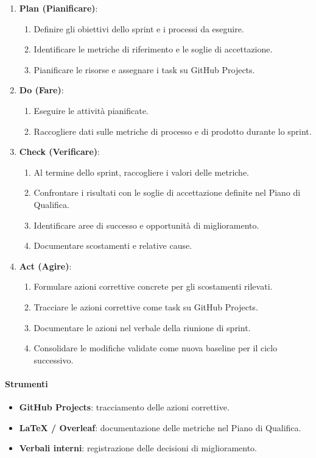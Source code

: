 \documentclass[a4paper, 11pt, oneside]{scrartcl}
\begin{document}
\begin{enumerate}
    \item \textbf{Plan (Pianificare)}:
    \begin{enumerate}[label=\alph*.]
        \item Definire gli obiettivi dello sprint e i processi da eseguire.
        \item Identificare le metriche di riferimento e le soglie di accettazione.
        \item Pianificare le risorse e assegnare i task su GitHub Projects.
    \end{enumerate}
    \item \textbf{Do (Fare)}:
    \begin{enumerate}[label=\alph*.]
        \item Eseguire le attività pianificate.
        \item Raccogliere dati sulle metriche di processo e di prodotto durante lo sprint.
    \end{enumerate}
    \item \textbf{Check (Verificare)}:
    \begin{enumerate}[label=\alph*.]
        \item Al termine dello sprint, raccogliere i valori delle metriche.
        \item Confrontare i risultati con le soglie di accettazione definite nel Piano di Qualifica{\scriptsize{}}.
        \item Identificare aree di successo e opportunità di miglioramento.
        \item Documentare scostamenti e relative cause.
    \end{enumerate}
    \item \textbf{Act (Agire)}:
    \begin{enumerate}[label=\alph*.]
        \item Formulare azioni correttive concrete per gli scostamenti rilevati.
        \item Tracciare le azioni correttive come task su GitHub Projects.
        \item Documentare le azioni nel verbale della riunione di sprint.
        \item Consolidare le modifiche validate come nuova baseline per il ciclo successivo.
    \end{enumerate}
\end{enumerate}

\paragraph{Strumenti}
\begin{itemize}
    \item \textbf{GitHub Projects}: tracciamento delle azioni correttive.
    \item \textbf{\LaTeX{} / Overleaf}: documentazione delle metriche nel Piano di Qualifica.
    \item \textbf{Verbali interni}: registrazione delle decisioni di miglioramento.
\end{itemize}
\end{document}
